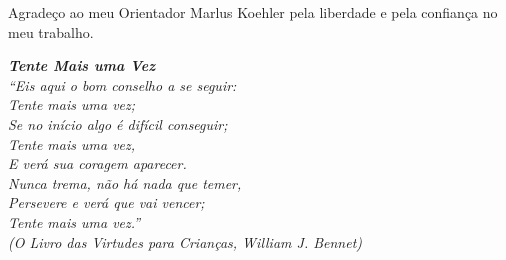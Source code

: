\documentclass[
	12pt,				%
	openright,			%
	twoside,			%
	a4paper,			%
	english,			%
	french,				%
	spanish,			%
	brazil				%
	]{abntex2}
\begin{document}
%      
%  


\begin{agradecimentos}
Agradeço ao meu Orientador Marlus Koehler pela liberdade e pela confiança no meu trabalho.

\end{agradecimentos}

\begin{epigrafe}
    \vspace*{\fill}
	\begin{flushright}
    \textit{\textbf{Tente Mais uma Vez}\\
    ``Eis aqui o bom conselho a se seguir:\\
		Tente mais uma vez;\\
    Se no início algo é difícil conseguir;\\
    Tente mais uma vez,\\
    E verá sua coragem aparecer.\\
    Nunca trema, não há nada que temer,\\
    Persevere e verá que vai vencer;\\
    Tente mais uma vez.''\\
		(O Livro das Virtudes para Crianças, William J. Bennet)}
	\end{flushright}
\end{epigrafe}
\end{document}

